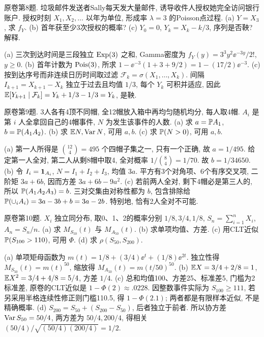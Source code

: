 \begin{exercise}\label{ex:flf19-8}
原卷第8题. 垃圾邮件发送者Sally每天发大量邮件, 诱导收件人授权她完全访问银行账户. 授权时刻 $X_1,X_2,\ldots$ 以年为单位, 形成率 $\lambda=3$ 的Poisson点过程. (a) $Y=X_3$, 求 $f_Y$. (b) 首年获至少3次授权的概率? (c) $Y_0=0$, $Y_k=X_k-k/3$, 序列是否鞅? 解释.
\end{exercise}
\begin{solution}
(a)\label{sol:flf19-8-a} 三次到达时间是三段独立 $\operatorname{Exp}(3)$ 之和, Gamma密度为 $f_Y(y)=3^3y^2\ee^{-3y}/2!$, $y\geq0$.
(b)\label{sol:flf19-8-b} 首年计数为 $\operatorname{Pois}(3)$, 所求 $1-\ee^{-3}(1+3+9/2)=1-(17/2)\ee^{-3}$.
(c)\label{sol:flf19-8-c} 按到达序号而非连续日历时间取过滤 $\mathcal F_k=\sigma(X_1,\ldots,X_k)$. 间隔 $I_{k+1}=X_{k+1}-X_k$ 独立于过去且均值 $1/3$, 每个 $Y_k$ 可积并适应, 因此 $\mathbb E[Y_{k+1}\mid\mathcal F_k]=Y_k+1/3-1/3=Y_k$, 是鞅.
\end{solution}

\begin{exercise}\label{ex:flf19-9}
原卷第9题. 3人各有4顶不同帽, 全12帽放入箱中再均匀随机均分, 每人取4帽. $A_i$ 是第 $i$ 人全拿回自己的4帽事件, $N$ 为发生该事件的人数. (a) 求 $a=\mathbb P A_1$, $b=\mathbb P(A_1A_2)$. (b) 求 $\mathbb E N,\operatorname{Var} N$, 可用 $a,b$. (c) 求 $\mathbb P(N>0)$, 可用 $a,b$.
\end{exercise}
\begin{solution}
(a)\label{sol:flf19-9-a} 第一人所得是 $\binom{12}4=495$ 个四帽子集之一, 只有一个正确, 故 $a=1/495$. 给定第一人全对, 第二人从剩8帽中取4, 全对概率 $1/\binom84=1/70$. 故 $b=1/34650$.
(b)\label{sol:flf19-9-b} 令 $I_i=\mathbf 1_{A_i}$, $N=I_1+I_2+I_3$, 均值 $3a$. 平方有3个对角项、6个有序交叉项, 二阶矩 $3a+6b$, 因而方差 $3a+6b-9a^2$.
(c)\label{sol:flf19-9-c} 若前两人全对, 剩下4帽必是第三人的, 所以 $\mathbb P(A_1A_2A_3)=b$. 三对交集由对称性都为 $b$, 包含排除给 $\mathbb P(\cup_iA_i)=3a-3b+b=3a-2b$. 特别地, 恰有2人全对不可能.
\end{solution}

\begin{exercise}\label{ex:flf19-10}
原卷第10题. $X_i$ 独立同分布, 取0、1、2的概率分别 $1/8,3/4,1/8$, $S_n=\sum_{i=1}^nX_i$, $A_n=S_n/n$. (a) 求 $M_{S_{50}}(t)$ 与 $M_{A_{50}}(t)$. (b) 求单项均值、方差. (c) 用CLT近似 $\mathbb P(S_{100}>110)$, 可用 $\Phi$. (d) 求 $\rho(S_{50},S_{200})$.
\end{exercise}
\begin{solution}
(a)\label{sol:flf19-10-a} 单项矩母函数为 $m(t)=1/8+(3/4)\ee^t+(1/8)\ee^{2t}$. 独立性得 $M_{S_{50}}(t)=m(t)^{50}$, 缩放得 $M_{A_{50}}(t)=m(t/50)^{50}$.
(b)\label{sol:flf19-10-b} $\mathbb E X=3/4+2/8=1$, $\mathbb E X^2=3/4+4/8=5/4$, 方差 $1/4$.
(c)\label{sol:flf19-10-c} 总和均值100、方差25、标准差5, 门槛为2标准差, 原卷的CLT近似是 $1-\Phi(2)\approx.0228$. 因整数事件实际为 $S_{100}\geq111$, 若另采用半格连续性修正则门槛110.5, 得 $1-\Phi(2.1)$; 两者都是有限样本近似, 不是精确概率.
(d)\label{sol:flf19-10-d} $S_{200}=S_{50}+(S_{200}-S_{50})$, 后者独立于前者. 所以协方差 $\operatorname{Var} S_{50}=50/4$, 两方差为 $50/4,200/4$, 得相关 $(50/4)/\sqrt{(50/4)(200/4)}=1/2$.
\end{solution}

